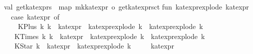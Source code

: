 \begin{isabellebody}
\isanewline
val\ get{}kat{}exprs\ {}\ map\ mk{}kat{}expr\ o\ get{}kat{}exprs{}ct\isanewline
\isanewline
fun\ kat{}expr{}explode\ kat{}expr\ {}\isanewline
\ \ case\ kat{}expr\ of\isanewline
\ \ \ \ {}KPlus\ {}k{}{}\ k{}{}{}\ {}{}\ kat{}expr\ {}{}\ {}kat{}expr{}explode\ k{}\ {}\ kat{}expr{}explode\ k{}{}\isanewline
\ \ {}\ {}KTimes\ {}k{}{}\ k{}{}{}\ {}{}\ kat{}expr\ {}{}\ {}kat{}expr{}explode\ k{}\ {}\ kat{}expr{}explode\ k{}{}\isanewline
\ \ {}\ {}KStar\ k{}\ {}{}\ kat{}expr\ {}{}\ kat{}expr{}explode\ k\isanewline
\ \ {}\ {}\ {}{}\ {}kat{}expr{}\isanewline

\end{isabellebody}

